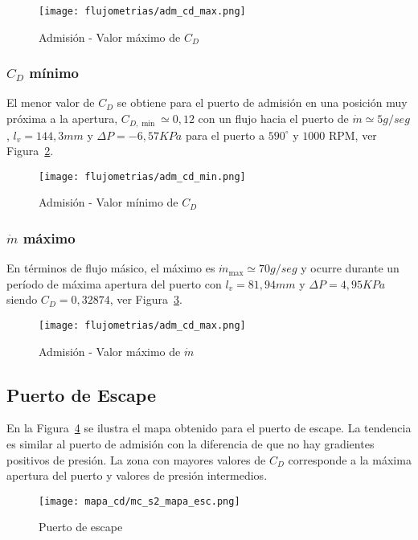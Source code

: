 \begin{figure}[ht!]
    \centering
    \texttt{[image: flujometrias/adm\_cd\_max.png]}
    \caption{Admisión - Valor máximo de $C_{D}$}\label{fig:adm_cd_max}
\end{figure}

\subsubsection{$C_{D}$ mínimo}
%
El menor valor de $C_{D}$ se obtiene para el puerto de admisión en una posición
muy próxima a la apertura, $C_{D,\min}\simeq 0,12$ con un flujo hacia el puerto
de $\dot{m}\simeq 5 g/seg$, $l_{v}=144,3 mm$ y $\Delta P=-6,57 KPa$ para el
puerto a $590^{\circ}$ y $1000$ RPM, ver Figura~\ref{fig:adm_cd_min}.

\begin{figure}[ht!]
    \centering
    \texttt{[image: flujometrias/adm\_cd\_min.png]}
    \caption{Admisión - Valor mínimo de $C_{D}$}\label{fig:adm_cd_min}
\end{figure}

\subsubsection{$\dot{m}$ máximo}
%
En términos de flujo másico, el máximo es $\dot{m}_{\max}\simeq 70 g/seg$ y ocurre
durante un período de máxima apertura del puerto con $l_{v}=81,94 mm$ y
$\Delta P=4,95 KPa$ siendo $C_{D}=0,32874$, ver Figura~\ref{fig:adm_m_max}.

\begin{figure}[ht!]
    \centering
    \texttt{[image: flujometrias/adm\_cd\_max.png]}
    \caption{Admisión - Valor máximo de $\dot{m}$}\label{fig:adm_m_max}
\end{figure}

\subsection{Puerto de Escape}
%
En la Figura~\ref{fig:mapa_cd_escape} se ilustra el mapa obtenido para el puerto
de escape.
%
La tendencia es similar al puerto de admisión con la diferencia de que no hay
gradientes positivos de presión.
%
La zona con mayores valores de $C_{D}$ corresponde a la máxima apertura del
puerto y valores de presión intermedios.
%

\begin{figure}[ht!]
    \centering
    \texttt{[image: mapa\_cd/mc\_s2\_mapa\_esc.png]}
    \caption{Puerto de escape}\label{fig:mapa_cd_escape}
\end{figure}

